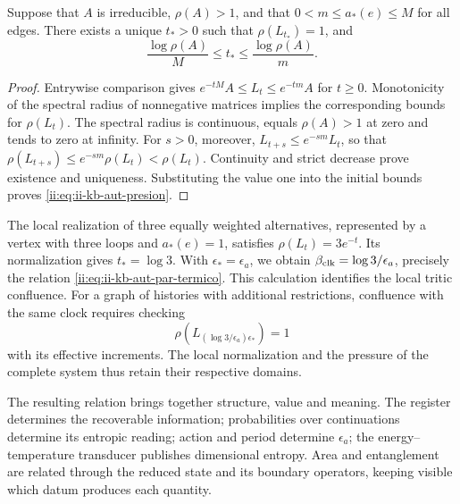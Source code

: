 \begin{proposition}
Suppose that \(A\) is irreducible, \(\rho(A)>1\), and that
\(0<m\leq a_*(e)\leq M\) for all edges. There exists a unique
\(t_*>0\) such that \(\rho(L_{t_*})=1\), and
\begin{equation}
 \frac{\log\rho(A)}{M}\leq t_*\leq
 \frac{\log\rho(A)}{m}.
 \label{ii:eq:ii-kb-aut-presion}
\end{equation}
\end{proposition}
\begin{proof}
Entrywise comparison gives
\(e^{-tM}A\leq L_t\leq e^{-tm}A\) for \(t\geq0\).
Monotonicity of the spectral radius of nonnegative matrices implies
the corresponding bounds for \(\rho(L_t)\). The spectral radius
is continuous, equals \(\rho(A)>1\) at zero and tends to zero at infinity.
For \(s>0\), moreover,
\(L_{t+s}\leq e^{-sm}L_t\), so that
\(\rho(L_{t+s})\leq e^{-sm}\rho(L_t)<\rho(L_t)\).
Continuity and strict decrease prove existence and
uniqueness. Substituting the value one into the initial bounds proves
\eqref{ii:eq:ii-kb-aut-presion}.
\end{proof}

The local realization of three equally weighted alternatives, represented
by a vertex with three loops and \(a_*(e)=1\), satisfies
\(\rho(L_t)=3e^{-t}\). Its normalization gives \(t_*=\log3\).
With \(\epsilon_*=\epsilon_a\), we obtain
\(\beta_{\rm clk}=\log3/\epsilon_a\), precisely the relation
\eqref{ii:eq:ii-kb-aut-par-termico}. This calculation identifies the
local tritic confluence. For a graph of histories with additional
restrictions, confluence with the same clock requires checking
\[
 \rho\!\left(L_{(\log3/\epsilon_a)\epsilon_*}\right)=1
\]
with its effective increments. The local normalization and the pressure
of the complete system thus retain their respective domains.

The resulting relation brings together structure, value and meaning. The register
determines the recoverable information; probabilities over
continuations determine its entropic reading; action and period
determine \(\epsilon_a\); the energy--temperature transducer
publishes dimensional entropy. Area and entanglement are
related through the reduced state and its boundary operators,
keeping visible which datum produces each quantity.
